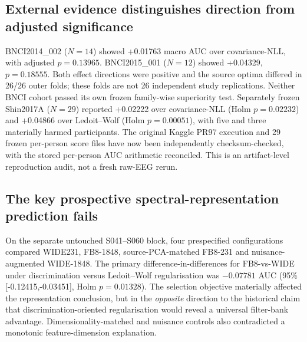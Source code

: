 \documentclass[11pt,a4paper]{article}
\begin{document}
\subsection{External evidence distinguishes direction from adjusted significance}
BNCI2014\_002 (\(N=14\)) showed +0.01763 macro AUC over
covariance-NLL, with adjusted \(p=0.13965\).
BNCI2015\_001 (\(N=12\)) showed +0.04329, \(p=0.18555\).
Both effect directions were positive and the source optima differed in
26/26 outer folds; these folds are not 26 independent study replications.
Neither BNCI cohort passed its own frozen family-wise superiority test.
Separately frozen Shin2017A (\(N=29\)) reported +0.02222 over
covariance-NLL (Holm \(p=0.02232\)) and +0.04866 over Ledoit--Wolf
(Holm \(p=0.00051\)), with five and three materially harmed
participants. The original Kaggle PR97 execution and 29 frozen per-person
score files have now been independently checksum-checked, with
the stored per-person AUC arithmetic reconciled. This is
an artifact-level reproduction audit, not a fresh raw-EEG rerun.















\subsection{The key prospective spectral-representation prediction fails}
On the separate untouched S041--S060 block, four prespecified
configurations compared WIDE231, FB8-1848, source-PCA-matched
FB8-231 and nuisance-augmented WIDE-1848. The primary
difference-in-differences for FB8-vs-WIDE under discrimination versus
Ledoit--Wolf regularisation was \(-0.07781\) AUC
(95\% [-0.12415,-0.03451], Holm \(p=0.01328\)).
The selection objective materially affected the representation
conclusion, but in the \emph{opposite} direction to the historical
claim that discrimination-oriented regularisation would reveal a
universal filter-bank advantage. Dimensionality-matched and nuisance
controls also contradicted a monotonic feature-dimension explanation.
\end{document}
